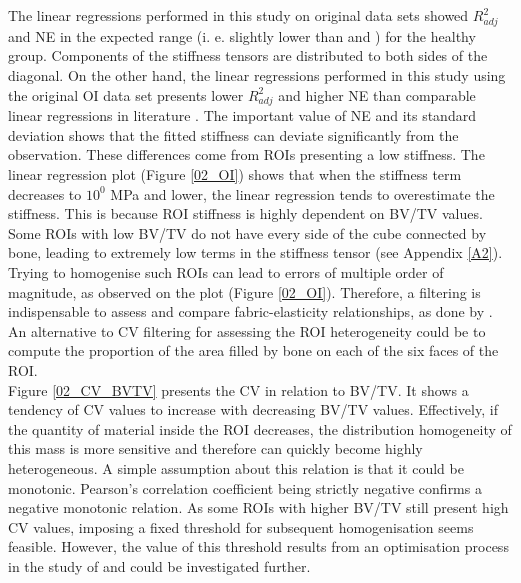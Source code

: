 \documentclass[a4paper,fleqn]{DC_ArtStyle}
\begin{document}
	The linear regressions performed in this study on original data sets showed $R^2_{adj}$ and NE in the expected range (i. e. slightly lower than \citeauthor{Gross2013}\cite{Gross2013} and \citeauthor{Panyasantisuk2015}\cite{Panyasantisuk2015}) for the healthy group. Components of the stiffness tensors are distributed to both sides of the diagonal. On the other hand, the linear regressions performed in this study using the original OI data set presents lower $R^2_{adj}$ and higher NE than comparable linear regressions in literature \cite{Gross2013,Panyasantisuk2015}. The important value of NE and its standard deviation shows that the fitted stiffness can deviate significantly from the observation. These differences come from ROIs presenting a low stiffness. The linear regression plot (Figure \ref{02_OI}) shows that when the stiffness term decreases to $10^0$ MPa and lower, the linear regression tends to overestimate the stiffness. This is because ROI stiffness is highly dependent on BV/TV values. Some ROIs with low BV/TV do not have every side of the cube connected by bone, leading to extremely low terms in the stiffness tensor (see Appendix \ref{A2}). Trying to homogenise such ROIs can lead to errors of multiple order of magnitude, as observed on the plot (Figure \ref{02_OI}). Therefore, a filtering is indispensable to assess and compare fabric-elasticity relationships, as done by \citeauthor{Panyasantisuk2015} \cite{Panyasantisuk2015}. An alternative to CV filtering for assessing the ROI heterogeneity could be to compute the proportion of the area filled by bone on each of the six faces of the ROI. \\
	
	Figure \ref{02_CV_BVTV} presents the CV in relation to BV/TV. It shows a tendency of CV values to increase with decreasing BV/TV values. Effectively, if the quantity of material inside the ROI decreases, the distribution homogeneity of this mass is more sensitive and therefore can quickly become highly heterogeneous. A simple assumption about this relation is that it could be monotonic. Pearson's correlation coefficient being strictly negative confirms a negative monotonic relation. As some ROIs with higher BV/TV still present high CV values, imposing a fixed threshold for subsequent homogenisation seems feasible. However, the value of this threshold results from an optimisation process in the study of \citeauthor{Panyasantisuk2015}\cite{Panyasantisuk2015} and could be investigated further. \\
	
\end{document}
